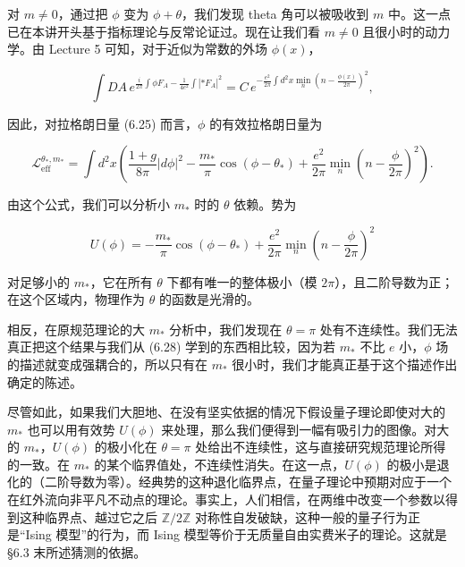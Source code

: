 对 $m\ne0$，通过把 $\phi$ 变为 $\phi+\theta$，我们发现 theta 角可以被吸收到 $m$ 中。这一点已在本讲开头基于指标理论与反常论证过。现在让我们看 $m\ne0$ 且很小时的动力学。由 Lecture 5 可知，对于近似为常数的外场 $\phi(x)$，

\begin{equation}
  \tag{6.26}
  \label{eq:6-26}
  \int DA\,e^{\frac{i}{2\pi}\int\phi F_A-\frac{1}{4e^2}\int|\ast F_A|^2}=C\,e^{-\frac{e^2}{2\pi}\int d^2x\min_n\left(n-\frac{\phi(x)}{2\pi}\right)^2},
\end{equation}

因此，对拉格朗日量 (6.25) 而言，$\phi$ 的有效拉格朗日量为

\begin{equation}
  \tag{6.27}
  \label{eq:6-27}
  \mathcal{L}^{\theta_*,m_*}_{\mathrm{eff}}=\int d^2x\left(\frac{1+g}{8\pi}|d\phi|^2-\frac{m_*}{\pi}\cos(\phi-\theta_*)+\frac{e^2}{2\pi}\min_n\left(n-\frac{\phi}{2\pi}\right)^2\right).
\end{equation}


由这个公式，我们可以分析小 $m_*$ 时的 $\theta$ 依赖。势为

\begin{equation}
  \tag{6.28}
  \label{eq:6-28}
  U(\phi)=-\frac{m_*}{\pi}\cos(\phi-\theta_*)+\frac{e^2}{2\pi}\min_n\left(n-\frac{\phi}{2\pi}\right)^2
\end{equation}

对足够小的 $m_*$，它在所有 $\theta$ 下都有唯一的整体极小（模 $2\pi$），且二阶导数为正；在这个区域内，物理作为 $\theta$ 的函数是光滑的。

相反，在原规范理论的大 $m_*$ 分析中，我们发现在 $\theta=\pi$ 处有不连续性。我们无法真正把这个结果与我们从 (6.28) 学到的东西相比较，因为若 $m_*$ 不比 $e$ 小，$\phi$ 场的描述就变成强耦合的，所以只有在 $m_*$ 很小时，我们才能真正基于这个描述作出确定的陈述。

尽管如此，如果我们大胆地、在没有坚实依据的情况下假设量子理论即使对大的 $m_*$ 也可以用有效势 $U(\phi)$ 来处理，那么我们便得到一幅有吸引力的图像。对大的 $m_*$，$U(\phi)$ 的极小化在 $\theta=\pi$ 处给出不连续性，这与直接研究规范理论所得的一致。在 $m_*$ 的某个临界值处，不连续性消失。在这一点，$U(\phi)$ 的极小是退化的（二阶导数为零）。经典势的这种退化临界点，在量子理论中预期对应于一个在红外流向非平凡不动点的理论。事实上，人们相信，在两维中改变一个参数以得到这种临界点、越过它之后 $\mathbb{Z}/2\mathbb{Z}$ 对称性自发破缺，这种一般的量子行为正是“Ising 模型”的行为，而 Ising 模型等价于无质量自由实费米子的理论。这就是 §6.3 末所述猜测的依据。

